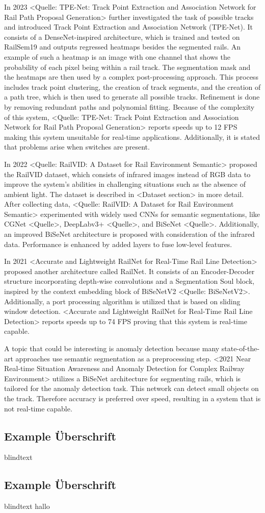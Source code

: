 In 2023 <Quelle: TPE-Net: Track Point Extraction and Association Network for Rail Path Proposal Generation> further investigated the task of possible tracks and introduced Track Point Extraction and Association Network (TPE-Net).
It consists of a DenseNet-inspired architecture, which is trained and tested on RailSem19 and outputs regressed heatmaps besides the segmented rails.
An example of such a heatmap is an image with one channel that shows the probability of each pixel being within a rail track.
The segmentation mask and the heatmaps are then used by a complex post-processing approach.
This process includes track point clustering, the creation of track segments, and the creation of a path tree, which is then used to generate all possible tracks.
Refinement is done by removing redundant paths and polynomial fitting.
Because of the complexity of this system, <Quelle: TPE-Net: Track Point Extraction and Association Network for Rail Path Proposal Generation> reports speeds up to 12 FPS making this system unsuitable for real-time applications.
Additionally, it is stated that problems arise when switches are present.

In 2022 <Quelle: RailVID: A Dataset for Rail Environment Semantic> proposed the RailVID dataset, which consists of infrared images instead of RGB data to improve the system's abilities in challenging situations such as the absence of ambient light.
The dataset is described in <Dataset section> in more detail.
After collecting data, <Quelle: RailVID: A Dataset for Rail Environment Semantic> experimented with widely used CNNs for semantic segmentations, like CGNet <Quelle>, DeepLabv3+ <Quelle>, and BiSeNet <Quelle>.
Additionally, an improved BiSeNet architecture is proposed with consideration of the infrared data. Performance is enhanced by added layers to fuse low-level features.

In 2021 <Accurate and Lightweight RailNet for Real-Time Rail Line Detection> proposed another architecture called RailNet.
It consists of an Encoder-Decoder structure incorporating depth-wise convolutions and a Segmentation Soul block, inspired by the context embedding block of BiSeNetV2 <Quelle: BiSeNetV2>.
Additionally, a port processing algorithm is utilized that is based on sliding window detection.
<Accurate and Lightweight RailNet for Real-Time Rail Line Detection> reports speeds up to 74 FPS proving that this system is real-time capable.

A topic that could be interesting is anomaly detection because many state-of-the-art approaches use semantic segmentation as a preprocessing step.
<2021 Near Real-time Situation Awareness and Anomaly Detection for Complex Railway Environment> utilizes a BiSeNet architecture for segmenting rails, which is tailored for the anomaly detection task.
This network can detect small objects on the track.
Therefore accuracy is preferred over speed, resulting in a system that is not real-time capable.

\subsection{Example Überschrift}

blindtext

\subsection{Example Überschrift}

blindtext hallo